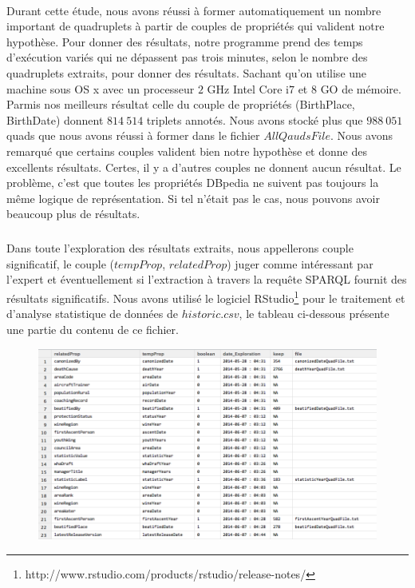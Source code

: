 \paragraph{}
Durant cette étude, nous avons réussi à former automatiquement un nombre important de quadruplets à partir de couples de propriétés qui valident notre hypothèse. Pour donner des résultats, notre programme prend des temps d'exécution variés qui ne dépassent pas trois minutes, selon le nombre des quadruplets extraits, pour donner des résultats. Sachant qu'on utilise une machine sous OS x avec un processeur $2$ GHz Intel Core i$7$ et $8$ GO de mémoire. Parmis nos meilleurs résultat celle du couple de propriétés (BirthPlace, BirthDate) donnent $814~514$ triplets annotés. Nous avons stocké plus que $988~051$ quads que nous avons réussi à former dans le fichier $AllQaudsFile$. Nous avons remarqué que certains couples valident bien notre hypothèse et donne des excellents résultats. Certes, il y a d'autres couples ne donnent aucun résultat. Le problème, c'est que toutes les propriétés DBpedia ne suivent pas toujours la même logique de représentation. Si tel n'était pas le cas, nous pouvons avoir beaucoup plus de résultats.
\subparagraph{}
Dans toute l'exploration des résultats extraits, nous appellerons couple significatif, le couple ($tempProp$, $relatedProp$) juger comme intéressant par l'expert et éventuellement si l'extraction à travers la requête SPARQL fournit des résultats significatifs. Nous avons utilisé le logiciel  RStudio\footnote{http://www.rstudio.com/products/rstudio/release-notes/} pour le traitement et d'analyse statistique de données de $historic.csv$, le tableau ci-dessous présente une partie du contenu de ce fichier. 
 \begin{figure}[H]
        \centering
                \includegraphics[width=13cm]{tableauCSV.png}
\end{figure}
